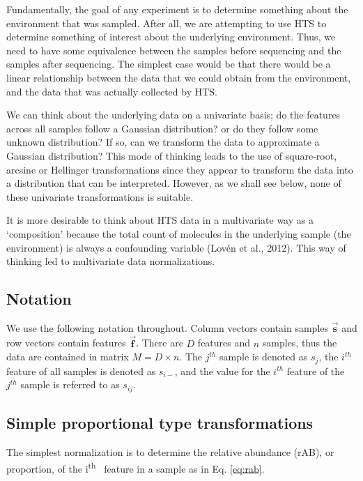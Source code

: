 \documentclass[twocolumn]{article}
\newcommand{\ith}[1]{ #1\textsuperscript{th}\ }
\begin{document}
Fundamentally, the goal of any experiment is to determine something
about the environment that was sampled. After all, we are attempting to
use HTS to determine something of interest about the underlying
environment. Thus, we need to have some equivalence between the samples
before sequencing and the samples after sequencing. The simplest case
would be that there would be a linear relationship between the data that
we could obtain from the environment, and the data that was actually
collected by HTS.

We can think about the underlying data on a univariate basis; do the
features across all samples follow a Gaussian distribution? or do they
follow some unknown distribution? If so, can we transform the data to
approximate a Gaussian distribution? This mode of thinking leads to the
use of square-root, arcsine or Hellinger transformations since they
appear to transform the data into a distribution that can be
interpreted. However, as we shall see below, none of these univariate
transformations is suitable.

It is more desirable to think about HTS data in a multivariate way as a
`composition' because the total count of molecules in the underlying
sample (the environment) is always a confounding variable (Lovén et al.,
2012). This way of thinking led to multivariate data normalizations.

\subsection{Notation}\label{notation}

We use the following notation throughout. Column vectors contain samples
\(\vec{\textbf{s}}\) and row vectors contain features
\(\vec{\textbf{f}}\). There are \(D\) features and \(n\) samples, thus
the data are contained in matrix \(M = D \times n\). The \(j^{th}\)
sample is denoted as \(s_{j}\), the \(i^{th}\) feature of all samples is
denoted as \(s_{i-}\), and the value for the \(i^{th}\) feature of the
\(j^{th}\) sample is referred to as \(s_{ij}\).

\subsection{Simple proportional type
transformations}\label{simple-proportional-type-transformations}

The simplest normalization is to determine the relative abundance (rAB),
or proportion, of the \ith{i} feature in a sample as in Eq.
\ref{eq:rab}.
\end{document}
